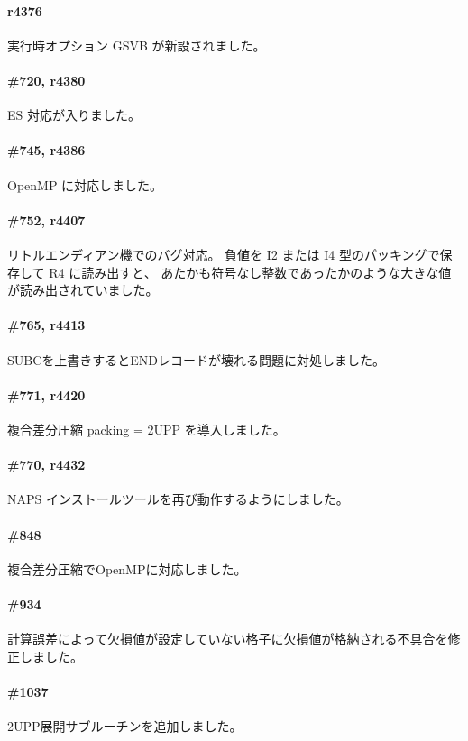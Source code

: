 \paragraph{r4376}
実行時オプション GSVB が新設されました。

\paragraph{\#720, r4380}
ES 対応が入りました。

\paragraph{\#745, r4386}
OpenMP に対応しました。

\paragraph{\#752, r4407}
リトルエンディアン機でのバグ対応。
負値を I2 または I4 型のパッキングで保存して R4 に読み出すと、
あたかも符号なし整数であったかのような大きな値が読み出されていました。

\paragraph{\#765, r4413}
SUBCを上書きするとENDレコードが壊れる問題に対処しました。

\paragraph{\#771, r4420}
複合差分圧縮 packing = 2UPP を導入しました。

\paragraph{\#770, r4432}
NAPS インストールツールを再び動作するようにしました。

\paragraph{\#848}
複合差分圧縮でOpenMPに対応しました。

\paragraph{\#934}
計算誤差によって欠損値が設定していない格子に欠損値が格納される不具合を修正しました。

\paragraph{\#1037}
2UPP展開サブルーチンを追加しました。

